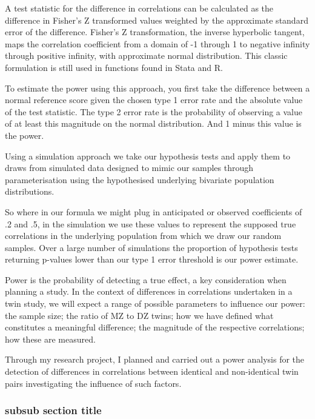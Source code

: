 A test statistic for the difference in correlations can be calculated as the difference in Fisher's Z transformed values weighted by the approximate standard error of the difference.  Fisher's Z transformation, the inverse hyperbolic tangent, maps the correlation coefficient from a domain of -1 through 1 to negative infinity through positive infinity, with approximate normal distribution.  This classic formulation is still used in functions found in Stata and R.

To estimate the power using this approach, you first take the difference between a normal reference score given the chosen type 1 error rate and the absolute value of the test statistic. The type 2 error rate is the probability of observing a value of at least this magnitude on the normal distribution.  And 1 minus this value is the power.

Using a simulation approach we take our hypothesis tests and apply them to draws from simulated data designed to mimic our samples through parameterisation using the hypothesised underlying bivariate population distributions.  

So where in our formula we might plug in anticipated or observed coefficients of .2 and .5, in the simulation we use these values to represent the supposed true correlations in the underlying population from which we draw our random samples.  Over a large number of simulations the proportion of hypothesis tests returning p-values lower than our type 1 error threshold is our power estimate.

 
 
Power is the probability of detecting a true effect, a key consideration when planning a study.  In the context of differences in correlations undertaken in a twin study, we will expect a range of possible parameters to influence our power: the sample size; the ratio of MZ to DZ twins; how we have defined what constitutes a meaningful difference; the magnitude of the respective correlations; how these are measured.

Through my research project, I planned and carried out a power analysis for the detection of differences in correlations between identical and non-identical twin pairs investigating the influence of such factors.  

 \subsubsection{subsub section title}
 

			
